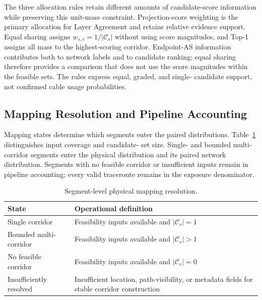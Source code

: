 The three allocation rules retain different amounts of candidate-score
information while preserving this unit-mass constraint. Projection-score
weighting is the primary allocation for Layer Agreement and retains
relative evidence support. Equal sharing assigns
\(w_{s,c}=1/|\mathcal{C}_s|\) without using score magnitudes, and Top-1
assigns all mass to the highest-scoring corridor. Endpoint-AS information
contributes both to network labels and to candidate ranking; equal sharing
therefore provides a comparison that does not use the score magnitudes
within the feasible sets. The rules express equal, graded, and single-
candidate support, not confirmed cable usage probabilities.

\subsection{Mapping Resolution and Pipeline Accounting}
\label{sec:framework_mapping_resolution}

Mapping states determine which segments enter the paired distributions.
Table~\ref{tab:mapping-resolution} distinguishes input coverage and candidate-
set size. Single- and bounded multi-corridor segments enter the physical
distribution and its paired network distribution. Segments with no feasible
corridor or insufficient inputs remain in pipeline accounting; every valid
traceroute remains in the exposure denominator.

\begin{table}[t]
  \centering
  \caption{Segment-level physical mapping resolution.}
  \label{tab:mapping-resolution}
  \footnotesize
  \setlength{\tabcolsep}{3.2pt}
  \begin{tabular}{p{}p{}}
    \toprule
    State & Operational definition \\
    \midrule
    Single corridor
      & Feasibility inputs available and \(|\mathcal{C}_s|=1\) \\
    Bounded multi-corridor
      & Feasibility inputs available and \(|\mathcal{C}_s|>1\) \\
    No feasible corridor
      & Feasibility inputs available and \(|\mathcal{C}_s|=0\) \\
    Insufficiently resolved
      & Insufficient location, path-visibility, or metadata fields for stable
        corridor construction \\
    \bottomrule
  \end{tabular}
\end{table}

